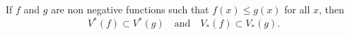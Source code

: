 If $f$ and $g$ are non negative functions such that $f(x) \leq g(x)$ for all $x$, then
$$V^*(f) \subset V^*(g) \quad \text{and} \quad V_*(f) \subset V_*(g).$$
